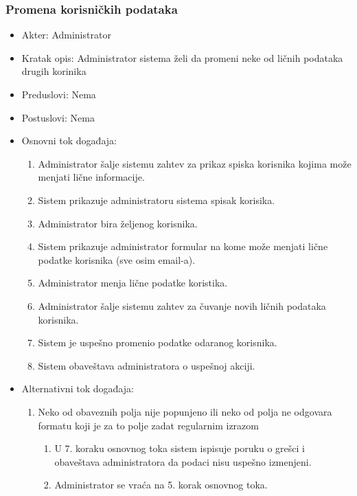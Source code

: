 \documentclass[a4paper]{article}
\begin{document}
\subsubsection{Promena korisničkih podataka}
\begin{itemize}
    \item Akter: Administrator
    \item Kratak opis: Administrator sistema želi da promeni neke od ličnih podataka drugih korinika
    \item Preduslovi: Nema
    \item Postuslovi: Nema
    \item Osnovni tok događaja:
        \begin{enumerate}
            \item Administrator šalje sistemu zahtev za prikaz spiska korisnika kojima može menjati lične informacije.
            \item Sistem prikazuje administratoru sistema spisak korisika.
            \item Administrator bira željenog korisnika.
            \item Sistem prikazuje administrator formular na kome može menjati lične podatke korisnika (sve osim email-a).
            \item Administrator menja lične podatke koristika.
            \item Administrator šalje sistemu zahtev za čuvanje novih ličnih podataka korisnika.
            \item Sistem je uspešno promenio podatke odaranog korisnika.
            \item Sistem obaveštava administratora o uspešnoj akciji.
        \end{enumerate}
    \item Alternativni tok događaja:
        \begin{enumerate}
            \item Neko od obaveznih polja nije popunjeno ili neko od polja ne odgovara formatu koji je za to polje zadat regularnim izrazom
                \begin{enumerate}
                    \item U 7. koraku osnovnog toka sistem ispisuje poruku o grešci i obaveštava administratora da podaci nisu uspešno izmenjeni.
                    \item Administrator se vraća na 5. korak osnovnog toka.
                \end{enumerate}
        \end{enumerate}
\end{itemize}
\end{document}
